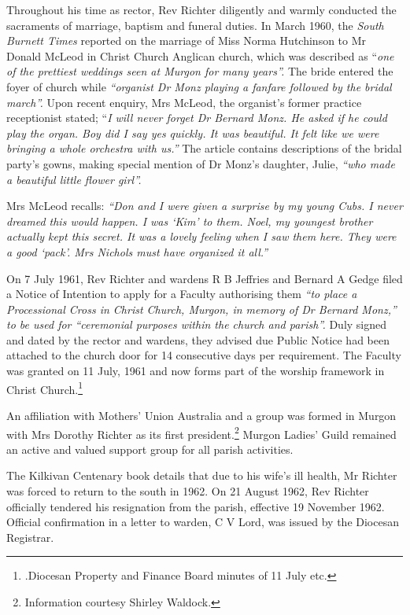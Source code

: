 Throughout his time as rector, Rev Richter diligently and warmly conducted the sacraments of marriage, baptism and funeral duties. In March 1960, the \emph{South Burnett Times} reported on the marriage of Miss Norma Hutchinson to Mr Donald McLeod in Christ Church Anglican church, which was described as ``\emph{one of the prettiest weddings seen at Murgon for many years''.} The bride entered the foyer of church while \emph{``organist Dr Monz playing a fanfare followed by the bridal march''.} Upon recent enquiry, Mrs McLeod, the organist's former practice receptionist stated; ``\emph{I will never forget Dr Bernard Monz. He asked if he could play the organ. Boy did I say yes quickly. It was beautiful. It felt like we were bringing a whole orchestra with us.''} The article contains descriptions of the bridal party's gowns, making special mention of Dr Monz's daughter, Julie, \emph{``who made a beautiful little flower girl''.}



Mrs McLeod recalls: \emph{``Don and I were given a surprise by my young Cubs. I never dreamed this would happen. I was `Kim' to them. Noel, my youngest brother actually kept this secret. It was a lovely feeling when I saw them here. They were a good `pack'. Mrs Nichols must have organized it all.''}



On 7 July 1961, Rev Richter and wardens R B Jeffries and Bernard A Gedge filed a Notice of Intention to apply for a Faculty authorising them \emph{``to place a Processional Cross in Christ Church, Murgon, in memory of Dr Bernard Monz,'' to be used for ``ceremonial purposes within the church and parish''.} Duly signed and dated by the rector and wardens, they advised due Public Notice had been attached to the church door for 14 consecutive days per requirement. The Faculty was granted on 11 July, 1961 and now forms part of the worship framework in Christ Church.\footnote{.Diocesan Property and Finance Board minutes of 11 July etc.}


An affiliation with Mothers' Union Australia and a group was formed in Murgon with Mrs Dorothy Richter as its first president.\footnote{Information courtesy Shirley Waldock.} Murgon Ladies' Guild remained an active and valued support group for all parish activities.


The Kilkivan Centenary book details that due to his wife's ill health, Mr Richter was forced to return to the south in 1962. On 21 August 1962, Rev Richter officially tendered his resignation from the parish, effective 19 November 1962. Official confirmation in a letter to warden, C V Lord, was issued by the Diocesan Registrar.



